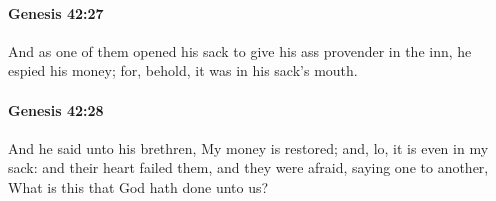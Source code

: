 		\paragraph{Genesis 42:27} %
			\label{GENESIS-42-27}

			And as one of them opened his sack to give his ass provender in the inn, he espied his money; for, behold, it was in his sack's mouth.


		\paragraph{Genesis 42:28} %
			\label{GENESIS-42-28}

			And he said unto his brethren, My money is restored; and, lo, it is even in my sack: and their heart failed them, and they were afraid, saying one to another, What is this that God hath done unto us?


